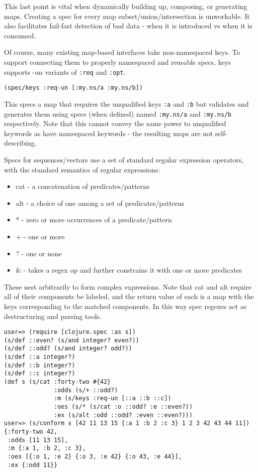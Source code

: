 This last point is vital when dynamically building up, composing, or generating
maps. Creating a spec for every map subset/union/intersection is unworkable. It
also facilitates fail-fast detection of bad data - when it is introduced vs when
it is consumed.

Of course, many existing map-based interfaces take non-namespaced keys. To
support connecting them to properly namespaced and reusable specs, keys supports
-un variants of \texttt{:req} and \texttt{:opt}.

\begin{verbatim}
(spec/keys :req-un [:my.ns/a :my.ns/b])
\end{verbatim}

This specs a map that requires the unqualified keys \texttt{:a} and \texttt{:b}
but validates and generates them using specs (when defined) named
\texttt{:my.ns/a} and \texttt{:my.ns/b} respectively. Note that this cannot
convey the same power to unqualified keywords as have namespaced keywords - the
resulting maps are not self-describing.

Specs for sequences/vectors use a set of standard regular expression operators,
with the standard semantics of regular expressions:

\begin{itemize}
\item cat - a concatenation of predicates/patterns
\item alt - a choice of one among a set of predicates/patterns
\item * - zero or more occurrences of a predicate/pattern
\item + - one or more
\item ? - one or none
\item \& - takes a regex op and further constrains it with one or more predicates
\end{itemize}

These nest arbitrarily to form complex expressions. Note that cat and alt
require all of their components be labeled, and the return value of each is a
map with the keys corresponding to the matched components. In this way spec
regexes act as destructuring and parsing tools.

\begin{verbatim}
user=> (require [clojure.spec :as s])
(s/def ::even? (s/and integer? even?))
(s/def ::odd? (s/and integer? odd?))
(s/def ::a integer?)
(s/def ::b integer?)
(s/def ::c integer?)
(def s (s/cat :forty-two #{42}
              :odds (s/+ ::odd?)
              :m (s/keys :req-un [::a ::b ::c])
              :oes (s/* (s/cat :o ::odd? :e ::even?))
              :ex (s/alt :odd ::odd? :even ::even?)))
user=> (s/conform s [42 11 13 15 {:a 1 :b 2 :c 3} 1 2 3 42 43 44 11])
{:forty-two 42,
 :odds [11 13 15],
 :m {:a 1, :b 2, :c 3},
 :oes [{:o 1, :e 2} {:o 3, :e 42} {:o 43, :e 44}],
 :ex {:odd 11}}
\end{verbatim}

